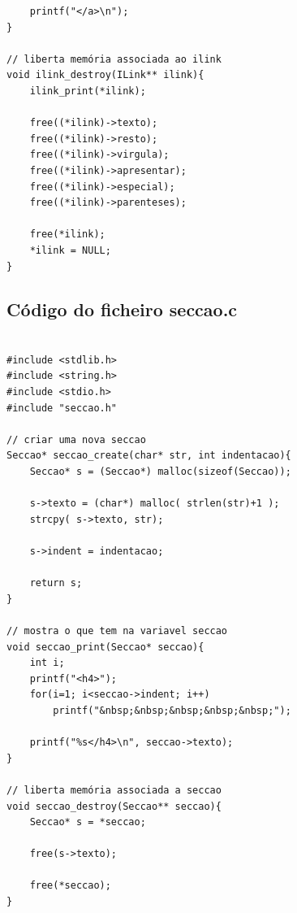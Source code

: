 \documentclass[11pt, a4paper, oneside]{article}
\begin{document}
\begin{verbatim}
    printf("</a>\n");
}

// liberta memória associada ao ilink
void ilink_destroy(ILink** ilink){
    ilink_print(*ilink);

    free((*ilink)->texto);
    free((*ilink)->resto);
    free((*ilink)->virgula);
    free((*ilink)->apresentar);
    free((*ilink)->especial);
    free((*ilink)->parenteses);

    free(*ilink);
    *ilink = NULL;
}
\end{verbatim}
\newpage

\subsection{Código do ficheiro seccao.c}
\begin{verbatim}

#include <stdlib.h>
#include <string.h>
#include <stdio.h>
#include "seccao.h"

// criar uma nova seccao
Seccao* seccao_create(char* str, int indentacao){
    Seccao* s = (Seccao*) malloc(sizeof(Seccao));

    s->texto = (char*) malloc( strlen(str)+1 );
    strcpy( s->texto, str);

    s->indent = indentacao;
    
    return s;
}

// mostra o que tem na variavel seccao
void seccao_print(Seccao* seccao){
    int i;
    printf("<h4>");
    for(i=1; i<seccao->indent; i++)
        printf("&nbsp;&nbsp;&nbsp;&nbsp;&nbsp;");

    printf("%s</h4>\n", seccao->texto);
}

// liberta memória associada a seccao
void seccao_destroy(Seccao** seccao){
    Seccao* s = *seccao;

    free(s->texto);

    free(*seccao);
}
\end{verbatim}
\newpage
\end{document}
